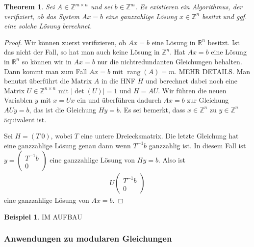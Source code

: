 \documentclass[
a4paper,landscape,16pt,
bibliography=totocnumbered,
numbers=noenddot,
]{scrartcl}
\numberwithin{equation}{subsection}
\newcommand{\Z}{\mathbb Z}
\newcommand{\R}{\mathbb R}
\newcommand{\rang}{\operatorname{rang}} %
\theoremstyle{plain}
\newtheorem*{thm}{Theorem}
\theoremstyle{definition}
\newtheorem*{bsp}{Beispiel}
\begin{document}
\begin{thm}
	Sei $A \in \Z^{m \times n}$ und sei $b \in \Z^m$. Es existieren ein Algorithmus, der verifiziert, ob das System $A x =b$ eine ganzzahlige Lösung $x \in \Z^n$ besitzt und ggf. eine solche Lösung berechnet. 
\end{thm} 
\begin{proof}
	Wir können zuerst verifizieren, ob $A x =b$ eine Lösung in $\R^n$ besitzt. Ist das nicht der Fall, so hat man auch keine Lösung in $\Z^n$. Hat $A x= b$ eine Lösung in $\R^n$ so können wir in $A x=b$ nur die nichtredundanten Gleichungen behalten. Dann kommt man zum Fall $A x =b$ mit $\rang(A) = m$. MEHR DETAILS. Man benutzt überführt die Matrix $A$ in die HNF $H$ und berechnet dabei noch eine Matrix $U \in \Z^{n \times n}$ mit $|\det(U)|=1$ und $H = A U$. Wir führen die neuen Variablen $y$ mit $x = U x$ ein und überführen dadurch $A x =b$ zur Gleichung $A U y = b$, das ist die Gleichung $H y = b$. Es sei bemerkt, dass $x \in \Z^n$ zu $y \in \Z^n$ äquivalent ist. 
	
	Sei $H  = (T \  0)$, wobei $T$ eine untere Dreiecksmatrix. Die letzte Gleichung hat eine ganzzahlige Lösung genau dann wenn $T^{-1} b$ ganzzahlig ist. In diesem Fall ist $y = \begin{pmatrix} T^{-1} b \\ 0 \end{pmatrix}$ eine ganzzahlige Lösung von $H y =b$. Also ist 
	\begin{align*}
			U \begin{pmatrix} T^{-1} b \\ 0 \end{pmatrix} 
	\end{align*}
	eine ganzzahlige Lösung von $A x= b$. 
\end{proof} 

\begin{bsp}
	IM AUFBAU 
\end{bsp} 

\subsubsection{Anwendungen zu modularen Gleichungen} 
\end{document}
